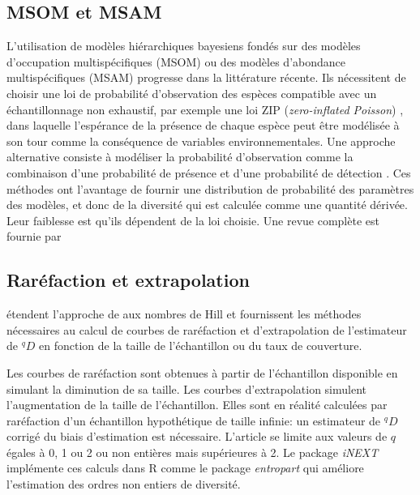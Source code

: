 \documentclass[
  11pt,
  french,
  a4paper,
  extrafontsizes,onecolumn,openright
  ]{memoir}
\begin{document}
\normalsize

\hypertarget{msom-et-msam}{%
\subsection{MSOM et MSAM}\label{msom-et-msam}}

L'utilisation de modèles hiérarchiques bayesiens fondés sur des modèles d'occupation multispécifiques (MSOM) ou des modèles d'abondance multispécifiques (MSAM) progresse dans la littérature récente.
Ils nécessitent de choisir une loi de probabilité d'observation des espèces compatible avec un échantillonnage non exhaustif, par exemple une loi ZIP (\emph{zero-inflated Poisson}) \autocite{Zhang2014c}, dans laquelle l'espérance de la présence de chaque espèce peut être modélisée à son tour comme la conséquence de variables environnementales.
Une approche alternative consiste à modéliser la probabilité d'observation comme la combinaison d'une probabilité de présence et d'une probabilité de détection \autocite{Broms2014}.
Ces méthodes ont l'avantage de fournir une distribution de probabilité des paramètres des modèles, et donc de la diversité qui est calculée comme une quantité dérivée. Leur faiblesse est qu'ils dépendent de la loi choisie. Une revue complète est fournie par \textcite{Iknayan2014}

\hypertarget{sec:RarExtrapol}{%
\subsection{Raréfaction et extrapolation}\label{sec:RarExtrapol}}

\textcite{Chao2014} étendent l'approche de \textcite{Gotelli2001} aux nombres de Hill et fournissent les méthodes nécessaires au calcul de courbes de raréfaction et d'extrapolation de l'estimateur de \(^{q}\!D\) en fonction de la taille de l'échantillon ou du taux de couverture.

Les courbes de raréfaction sont obtenues à partir de l'échantillon disponible en simulant la diminution de sa taille.
Les courbes d'extrapolation simulent l'augmentation de la taille de l'échantillon.
Elles sont en réalité calculées par raréfaction d'un échantillon hypothétique de taille infinie: un estimateur de \(^{q}\!D\) corrigé du biais d'estimation est nécessaire.
L'article se limite aux valeurs de \(q\) égales à 0, 1 ou 2 ou non entières mais supérieures à 2.
Le package \emph{iNEXT} \autocite{Hsieh2014} implémente ces calculs dans R comme le package \emph{entropart} qui améliore l'estimation des ordres non entiers de diversité.
\end{document}
